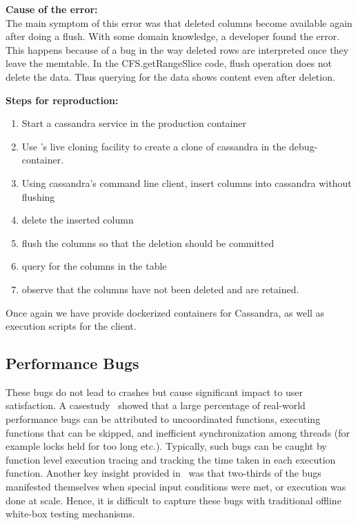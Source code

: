 \noindent \textbf{Cause of the error:} \\

The main symptom of this error was that deleted columns become available again after doing a flush.
With some domain knowledge, a developer found the error. 
This happens because of a bug in the way deleted rows are interpreted once they leave the memtable. 
In the CFS.getRangeSlice code, flush operation does not delete the data. 
Thus querying for the data shows content even after deletion.

\noindent \textbf{Steps for reproduction:} \\

\begin{adjustwidth}{0.5cm}{}
	\begin{enumerate}
		\item Start a cassandra service in the production container
		\item Use \parikshan's live cloning facility to create a clone of cassandra in the debug-container.
		\item Using cassandra's command line client, insert columns into cassandra without flushing
		\item delete the inserted column
		\item flush the columns so that the deletion should be committed
		\item query for the columns in the table
		\item observe that the columns have not been deleted and are retained.
	\end{enumerate}
\end{adjustwidth}

Once again we have provide dockerized containers for Cassandra, as well as execution scripts for the client.

\subsection{Performance Bugs}

These bugs do not lead to crashes but cause significant impact to user satisfaction.
A casestudy~\cite{shanluPerf} showed that a large percentage of real-world performance bugs can be attributed to uncoordinated functions, executing functions that can be skipped, and inefficient synchronization among threads (for example locks held for too long etc.).
Typically, such bugs can be caught by function level execution tracing and tracking the time taken in each execution function.
Another key insight provided in~\cite{shanluPerf} was that two-thirds of the bugs manifested themselves when special input conditions were met, or execution was done at scale. 
Hence, it is difficult to capture these bugs with traditional offline white-box testing mechanisms.


